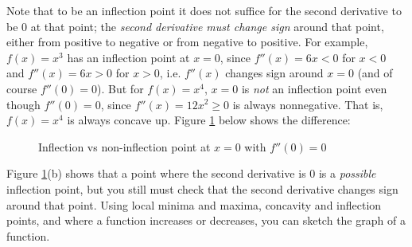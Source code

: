 Note that to be an inflection point it does not suffice for the second
derivative to be 0 at that point; the \emph{second derivative must change sign}
around that point, either from positive to negative or from negative to positive.
For example, $f(x) = x^3$ has an inflection point at $x=0$, since $f''(x)=6x<0$
for $x<0$ and $f''(x)=6x>0$ for $x>0$, i.e. $f''(x)$ changes sign around $x=0$
(and of course $f''(0)=0$). But for $f(x)=x^4$, $x=0$ is \emph{not} an
inflection point even though $f''(0)=0$, since $f''(x)=12x^2\ge 0$ is always
nonnegative. That is, $f(x)=x^4$ is always concave up. Figure
\ref{fig:inflpt} below shows the difference:
\newpage
\begin{figure}[ht]
 \centering
 \qquad
 \caption[]{\quad Inflection vs non-inflection point at $x=0$ with $f''(0)=0$}
 \label{fig:inflpt}
\end{figure}

\noindent Figure \ref{fig:inflpt}(b) shows that a point where the second
derivative is 0 is a \emph{possible} inflection point, but you still must check
that the second derivative changes sign around that point.
Using local minima and maxima, concavity and inflection points, and where a
function increases or decreases, you can sketch the graph of a function.

